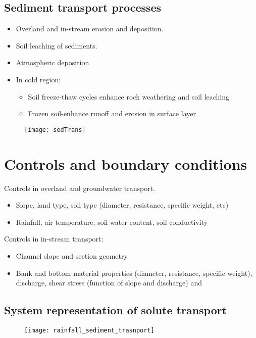 \documentclass[12pt, letterpaper]{article}
\begin{document}
\subsection{Sediment transport processes}
\begin{itemize}
\item Overland and in-stream erosion and deposition.
\item Soil leaching of sediments.
\item Atmospheric deposition
\item In cold region:
\begin{itemize}
\item Soil freeze-thaw cycles enhance rock weathering and soil leaching
\item Frozen soil-enhance runoff and erosion in surface layer
\end{itemize}
\end{itemize}
\begin{figure}
\texttt{[image: sedTrans]}
\end{figure}

\section{Controls and boundary conditions}
Controls in overland and groundwater transport.
\begin{itemize}
\item Slope, land type, soil type (diameter, resistance, specific weight, etc)
\item Rainfall, air temperature, soil water content, soil conductivity 
\end{itemize}

Controls in in-stream transport:
\begin{itemize}
\item Channel slope and section geometry
\item Bank and bottom material properties (diameter, resistance, specific weight), discharge, shear stress (function of slope and discharge) and 
\end{itemize}

\subsection{System representation of solute transport}
  \begin{figure}
    \centering
    \texttt{[image: rainfall\_sediment\_trasnport]}
  \end{figure}
\end{document}
